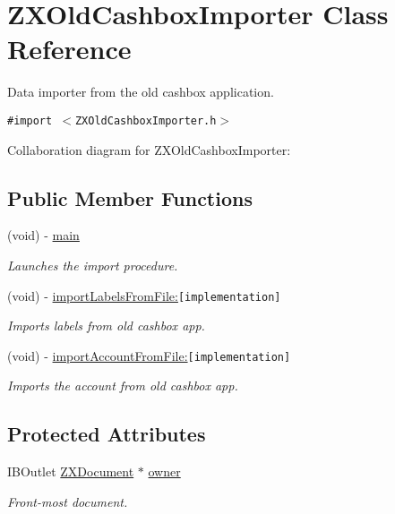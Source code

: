 \hypertarget{interface_z_x_old_cashbox_importer}{
\section{ZXOldCashboxImporter Class Reference}
\label{interface_z_x_old_cashbox_importer}
}
Data importer from the old cashbox application.  


{\tt \#import $<$ZXOldCashboxImporter.h$>$}

Collaboration diagram for ZXOldCashboxImporter:\subsection*{Public Member Functions}
\begin{CompactItemize}
\item 
\hypertarget{interface_z_x_old_cashbox_importer_c2405c654a0f53cf58b5edc8eedd5053}{
(void) - \hyperlink{interface_z_x_old_cashbox_importer_c2405c654a0f53cf58b5edc8eedd5053}{main}}
\label{interface_z_x_old_cashbox_importer_c2405c654a0f53cf58b5edc8eedd5053}

\begin{CompactList}\small\item\em Launches the import procedure. \item\end{CompactList}\item 
(void) - \hyperlink{interface_z_x_old_cashbox_importer_a0ff323ece14ee720fa1f60148ce419f}{importLabelsFromFile:}{\tt  \mbox{[}implementation\mbox{]}}
\begin{CompactList}\small\item\em Imports labels from old cashbox app. \item\end{CompactList}\item 
(void) - \hyperlink{interface_z_x_old_cashbox_importer_58a7e29a3daf68ba41686fef6f46bdc4}{importAccountFromFile:}{\tt  \mbox{[}implementation\mbox{]}}
\begin{CompactList}\small\item\em Imports the account from old cashbox app. \item\end{CompactList}\end{CompactItemize}
\subsection*{Protected Attributes}
\begin{CompactItemize}
\item 
\hypertarget{interface_z_x_old_cashbox_importer_4e36a2d0aa69005f1e8ce375bec7374f}{
IBOutlet \hyperlink{interface_z_x_document}{ZXDocument} $\ast$ \hyperlink{interface_z_x_old_cashbox_importer_4e36a2d0aa69005f1e8ce375bec7374f}{owner}}
\label{interface_z_x_old_cashbox_importer_4e36a2d0aa69005f1e8ce375bec7374f}

\begin{CompactList}\small\item\em Front-most document. \item\end{CompactList}\end{CompactItemize}
